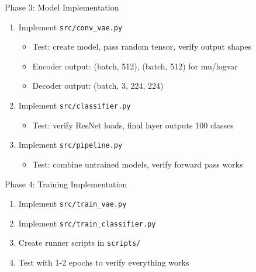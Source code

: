 \documentclass[11pt,a4paper]{article}
\begin{document}
\begin{conceptbox}{Phase 3: Model Implementation}
\begin{enumerate}[noitemsep]
    \item Implement \texttt{src/conv\_vae.py}
    \begin{itemize}[noitemsep]
        \item Test: create model, pass random tensor, verify output shapes
        \item Encoder output: (batch, 512), (batch, 512) for mu/logvar
        \item Decoder output: (batch, 3, 224, 224)
    \end{itemize}
    \item Implement \texttt{src/classifier.py}
    \begin{itemize}[noitemsep]
        \item Test: verify ResNet loads, final layer outputs 100 classes
    \end{itemize}
    \item Implement \texttt{src/pipeline.py}
    \begin{itemize}[noitemsep]
        \item Test: combine untrained models, verify forward pass works
    \end{itemize}
\end{enumerate}
\end{conceptbox}

\vspace{0.3cm}

\begin{conceptbox}{Phase 4: Training Implementation}
\begin{enumerate}[noitemsep]
    \item Implement \texttt{src/train\_vae.py}
    \item Implement \texttt{src/train\_classifier.py}
    \item Create runner scripts in \texttt{scripts/}
    \item Test with 1-2 epochs to verify everything works
\end{enumerate}
\end{conceptbox}

\newpage
\end{document}
